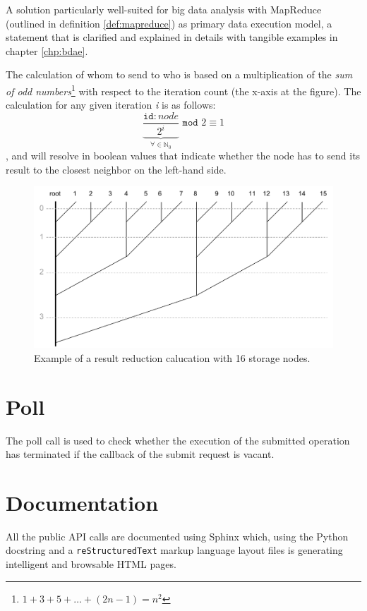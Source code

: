 A solution particularly well-suited for big data analysis with MapReduce (outlined in definition \ref{def:mapreduce}) as primary data execution model, a statement that is clarified and explained in details with tangible examples in chapter \ref{chp:bdae}.
\newline

The calculation of whom to send to who is based on a multiplication of the \textit{sum of odd numbers}\footnote{$1 + 3 + 5 + \ldots + (2n-1) = n^2$} with respect to the iteration count (the x-axis at the figure). The calculation for any given iteration \textit{i} is as follows:
\begin{equation}
\underbrace{\dfrac{\texttt{id}:node}{2^{i}}}_{\forall \in \mathbb{N}_0} \texttt{ mod } 2 \equiv 1
\end{equation}
, and will resolve in boolean values that indicate whether the node has to send its result to the closest neighbor on the left-hand side.

\begin{figure}
	\centering
	\includegraphics[scale=0.5]{pdf/reduction-tree.pdf}
	\caption[Result reduction calucation example]{Example of a result reduction calucation with 16 storage nodes. \label{fig:reduction-tree}}
\end{figure}	

\section{Poll}
The poll call is used to check whether the execution of the submitted operation has terminated if the callback of the submit request is vacant.

\section{Documentation}
All the public API calls are documented using Sphinx \cite{PageSphinx} which, using the Python docstring and a \texttt{reStructuredText} markup language layout files is generating intelligent and browsable HTML pages.
